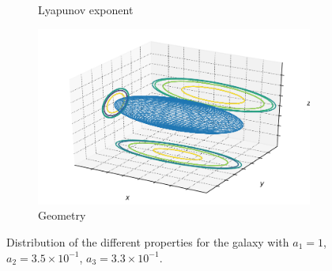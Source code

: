 \begin{figure}[h]
\begin{subfigure}[t]{0.4\textwidth}
        \caption{Lyapunov exponent}
    \end{subfigure}
    \begin{subfigure}[t]{0.4\textwidth}
        \includegraphics[width=\textwidth]{"../Files/Week 13/images/15_ellipsoid"}
        \caption{Geometry}
    \end{subfigure}
    \caption{Distribution of the different properties for the galaxy with $a_1 = 1$, $a_2 = 3.5\times10^{-1}$, $a_3 = 3.3\times10^{-1}$.}
\end{figure}


